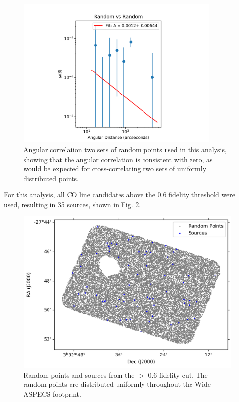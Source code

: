 \begin{figure}[tbp]
[CHANGE TO ONE NEEDED -> FLAT ONE]
\centering \includegraphics[width=100mm]{clustering/Log_Random_vs_Random_15000NoParenFlip_bin10.png}
\caption{Angular correlation two sets of random points used in this analysis, showing that the angular correlation is consistent with zero, as would be expected for cross-correlating two sets of uniformly distributed points.}
\label{fig:random_points}
\end{figure}



For this analysis, all CO line candidates above the 0.6 fidelity threshold were used, resulting in 35 sources, shown in Fig. \ref{fig:Clustering_points}. 

\begin{figure}[tbp]
\centering \includegraphics[width=120mm]{PDFS/NX_V_Y_Sources_20000.png}
\caption{Random points and sources from the $>$ 0.6 fidelity cut. The random points are distributed uniformly throughout the Wide ASPECS footprint.}
\label{fig:Clustering_points}
\end{figure}

